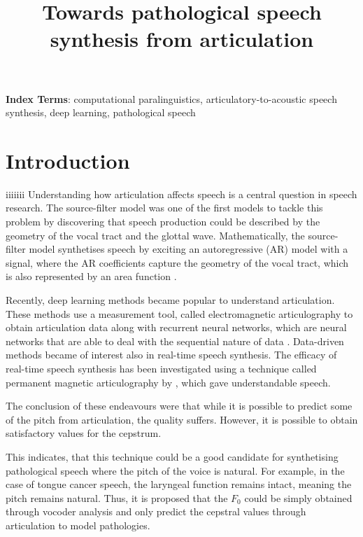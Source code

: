 \documentclass[a4paper]{article}
\title{Towards pathological speech synthesis from articulation}
\begin{document}
\maketitle
% 
\begin{abstract}
  \blindtext[1]
\end{abstract}
\noindent\textbf{Index Terms}: computational paralinguistics, articulatory-to-acoustic
speech synthesis, deep learning, pathological speech

\section{Introduction}
iiiiiii
Understanding how articulation affects speech is a central question in speech
research. The source-filter model was one of the first models to tackle this
problem by discovering that speech production could be described by
the geometry of the vocal tract and the glottal wave. Mathematically,
the source-filter model synthetises speech by exciting an autoregressive (AR) model with a
signal, where the AR coefficients capture the geometry of the
vocal tract, which is also represented by an area function \cite{Benesty2009}. 

Recently, deep learning methods became popular
to understand articulation. These methods use a measurement tool,
called electromagnetic articulography to obtain articulation data 
\cite{Aryal2016} \cite{Taguchi} \cite{Liu2018} along with recurrent
neural networks, which are neural networks that are able to deal with
the sequential nature of data \cite{Hochreiter1997}. Data-driven methods became of interest also
in real-time speech synthesis. The efficacy of real-time speech synthesis
has been investigated using a technique called permanent magnetic articulography
by \cite{Gonzalez2017}, which gave understandable
speech.

The conclusion of these endeavours were that while it is possible to
predict some of the pitch from articulation, the quality suffers.
However, it is possible to obtain satisfactory values for the
cepstrum.

This indicates, that this technique could be a good candidate for synthetising
pathological speech where the pitch of the voice is natural. For example,
in the case of tongue cancer speech, the laryngeal function remains intact,
meaning the pitch remains natural. Thus, it is proposed that the \( F_0 \) could
be simply obtained through vocoder analysis and only predict the cepstral
values through articulation to model pathologies.
\end{document}
